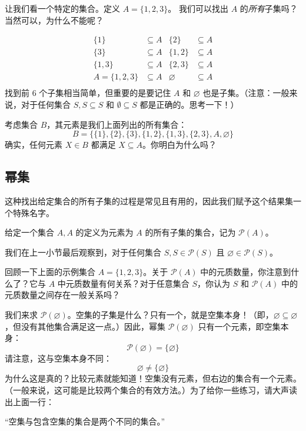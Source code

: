 让我们看一个特定的集合。定义 $A = \{1, 2, 3\}$。 我们可以找出 $A$ 的\emph{所有}子集吗？当然可以，为什么不能呢？

\begin{align*}
    \{1\} &\subseteq A  & \{2\} &\subseteq A \\
    \{3\} &\subseteq A & \{1,2\} &\subseteq A \\
    \{1,3\} &\subseteq A & \{2,3\} &\subseteq A \\
    A = \{1, 2,3\} &\subseteq A & \varnothing &\subseteq A \\
\end{align*}
找到前 6 个子集相当简单，但重要的是要记住 $A$ 和 $\varnothing$ 也是子集。（注意：一般来说，对于任何集合 $S, S \subseteq S$ 和 $∅ \subseteq S$ 都是正确的。思考一下！）

考虑集合 $B$，其元素是我们上面列出的所有集合：
\[B = \{\{1\}, \{2\}, \{3\}, \{1, 2\}, \{1, 3\}, \{2, 3\}, A, \varnothing\}\]
确实，任何元素 $X \in B$ 都满足 $X \subseteq A$。你明白为什么吗？

\subsection{幂集}

这种找出给定集合的所有子集的过程是常见且有用的，因此我们赋予这个结果集一个特殊名字。

\begin{definition}
    给定一个集合 $A, A$ 的定义为元素为 $A$ 的所有子集的集合，记为 $\mathcal{P}(A)$。
\end{definition}

我们在上一小节最后观察到，对于任何集合 $S, S \in \mathcal{P}(S)$ 且 $\varnothing \in \mathcal{P}(S)$。

回顾一下上面的示例集合 $A = \{1, 2, 3\}$。关于 $\mathcal{P}(A)$ 中的元质数量，你注意到什么了？它与 $A$ 中元质数量有何关系？对于任意集合 $S$，你认为 $S$ 和 $\mathcal{P}(A)$ 中的元质数量之间存在一般关系吗？\\

\begin{example}
    我们来求 $\mathcal{P}(\varnothing)$。空集的子集是什么？只有一个，就是空集本身！（即，$\varnothing \subseteq \varnothing$，但没有其他集合满足这一点。）因此，幂集 $\mathcal{P}(\varnothing)$ 只有一个元素，即空集本身：
    \[\mathcal{P}(\varnothing) = \{ \varnothing \}\]
    请注意，这与空集本身不同：
    \[\varnothing \ne \{ \varnothing \}\]
    为什么这是真的？比较元素就能知道！空集没有元素，但右边的集合有一个元素。（一般来说，这可能是比较两个集合的有效方法。）为了给你一些练习，请大声读出上面一行：
    \begin{center}
        ``空集与包含空集的集合是两个不同的集合。''
    \end{center}
\end{example}

